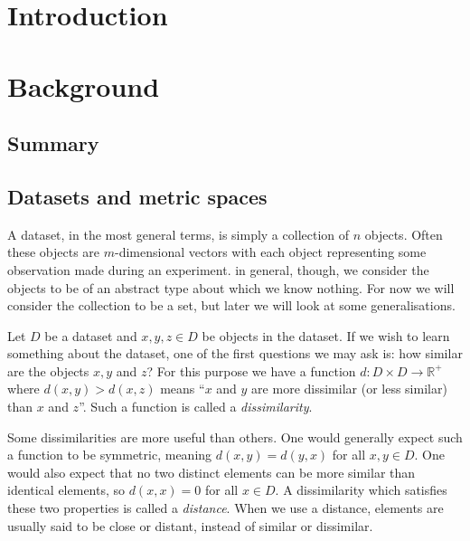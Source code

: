 \documentclass[a4paper]{report}
\title{\reporttitle}
\author{\reportauthor}
\newcommand{\dset}{D}
\begin{document}
\maketitle

\tableofcontents

\chapter{Introduction}
\label{cha:introduction}

\chapter{Background}
\label{cha:background}

\section{Summary}
\label{sec:summary-backgd}


\section{Datasets and metric spaces}
\label{sec:datas-metr-spac}

A dataset, in the most general terms, is simply a collection of $n$ objects.
Often these objects are $m$-dimensional vectors with each object representing
some observation made during an experiment.  in general, though, we consider
the objects to be of an abstract type about which we know nothing.  For now we
will consider the collection to be a set, but later we will look at some
generalisations.

Let $\dset$ be a dataset and $x,y,z \in \dset$ be objects in the dataset.  If
we wish to learn something about the dataset, one of the first questions we
may ask is: how similar are the objects $x,y$ and $z$?  For this purpose we
have a function $d \colon \dset \times \dset \to \mathbb{R}^+$ where
$d(x,y)>d(x,z)$ means ``$x$ and $y$ are more dissimilar (or less similar) than
$x$ and $z$''.  Such a function is called a \textit{dissimilarity}.

Some dissimilarities are more useful than others.  One would generally expect
such a function to be symmetric, meaning $d(x,y)=d(y,x)$ for all $x,y \in
\dset$.  One would also expect that no two distinct elements can be more
similar than identical elements, so $d(x,x)=0$ for all $x \in \dset$.  A
dissimilarity which satisfies these two properties is called a
\textit{distance}.  When we use a distance, elements are usually said to be
close or distant, instead of similar or dissimilar.
\end{document}
